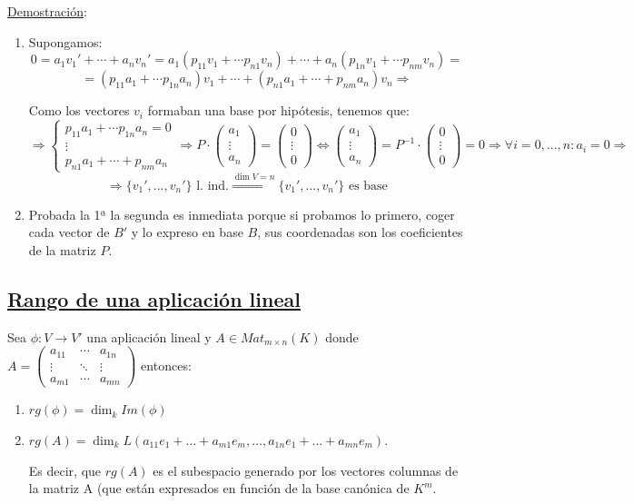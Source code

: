 \documentclass[10pt,a4paper,openright]{book}
\begin{document}
\underline{Demostración}:
\begin{enumerate}
\item Supongamos:
$$0=a_1v_1'+\cdots+ a_nv_n'=a_1(p_{11}v_1+\cdots p_{n1}v_n)+\cdots +a_n(p_{1n}v_1+\cdots p_{nm}v_n)=$$
$$=(p_{11}a_1+\cdots p_{1n}a_n)v_1+\cdots +(p_{n1}a_1+\cdots +p_{nm}a_n)v_n\Rightarrow $$

Como los vectores $v_i$ formaban una base por hipótesis, tenemos que:
$$\Rightarrow 
\begin{cases}
p_{11}a_1+\cdots p_{1n}a_n=0 \\
\vdots \\
p_{n1}a_1+\cdots +p_{nm}a_n
\end{cases}\Rightarrow P\cdot \begin{pmatrix} a_1 \\ \vdots \\ a_n\end{pmatrix}= \begin{pmatrix} 0 \\ \vdots \\ 0\end{pmatrix}\Leftrightarrow   \begin{pmatrix} a_1 \\ \vdots \\ a_n\end{pmatrix}= P^{-1}\cdot \begin{pmatrix} 0 \\ \vdots \\ 0\end{pmatrix}=0\Rightarrow \forall i=0,..., n: a_i=0\Rightarrow $$
$$\Rightarrow \{v_1', ..., v_n'\}\mbox{ l. ind.}\stackrel{\dim V=n}{\Rightarrow} \{v_1', ..., v_n'\}\mbox{ es base}
$$

\item Probada la 1ª la segunda es inmediata porque si probamos lo primero, coger cada vector de $B'$ y lo expreso en base $B$, sus coordenadas son los coeficientes de la matriz $P$.
\end{enumerate}

\subsection*{\underline{Rango de una aplicación lineal}}
Sea $\phi: V\longrightarrow V'$ una aplicación lineal y $A\in Mat_{m\times n}(K)$ donde $A=\begin{pmatrix} a_{11} & \cdots  & a_{1n}\\ \vdots & \ddots & \vdots \\ a_{m1} & \cdots &a_{mn}\end{pmatrix}$ entonces:
\begin{enumerate}
\item $rg(\phi)=\dim_k Im(\phi)$
\item $rg(A)=\dim_k L(a_{11}e_{1}+...+a_{m1}e_m, ..., a_{1n}e_1+...+a_{mn}e_m)$.\par
Es decir, que $rg(A)$ es el subespacio generado por los vectores columnas de la matriz A (que están expresados en función de la base canónica de $K^m$.
\end{enumerate}
\end{document}
